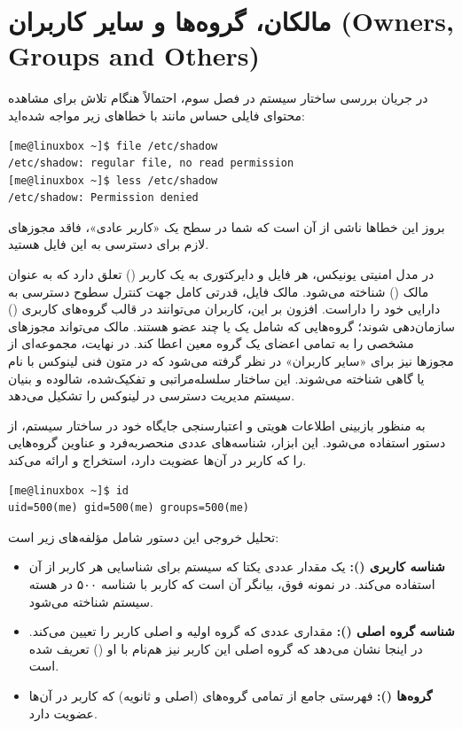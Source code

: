 \section{مالکان، گروه‌ها و سایر کاربران (Owners, Groups and Others)}

در جریان بررسی ساختار سیستم در فصل سوم، احتمالاً هنگام تلاش برای مشاهده محتوای فایلی حساس مانند  با خطاهای زیر مواجه شده‌اید:

\begin{latin}
\begin{lstlisting}
[me@linuxbox ~]$ file /etc/shadow
/etc/shadow: regular file, no read permission
[me@linuxbox ~]$ less /etc/shadow
/etc/shadow: Permission denied
\end{lstlisting}
\end{latin}

بروز این خطاها ناشی از آن است که شما در سطح یک «کاربر عادی»، فاقد مجوزهای لازم برای دسترسی به این فایل هستید.

در مدل امنیتی یونیکس، هر فایل و دایرکتوری به یک کاربر () تعلق دارد که به عنوان مالک () شناخته می‌شود. مالک فایل، قدرتی کامل جهت کنترل سطوح دسترسی به دارایی خود را داراست. افزون بر این، کاربران می‌توانند در قالب گروه‌های کاربری () سازمان‌دهی شوند؛ گروه‌هایی که شامل یک یا چند عضو هستند. مالک می‌تواند مجوزهای مشخصی را به تمامی اعضای یک گروه معین اعطا کند. در نهایت، مجموعه‌ای از مجوزها نیز برای «سایر کاربران» در نظر گرفته می‌شود که در متون فنی لینوکس با نام  یا گاهی  شناخته می‌شوند. این ساختار سلسله‌مراتبی و تفکیک‌شده، شالوده و بنیان سیستم مدیریت دسترسی در لینوکس را تشکیل می‌دهد.

به منظور بازبینی اطلاعات هویتی و اعتبارسنجی جایگاه خود در ساختار سیستم، از دستور  استفاده می‌شود. این ابزار، شناسه‌های عددی منحصربه‌فرد و عناوین گروه‌هایی را که کاربر در آن‌ها عضویت دارد، استخراج و ارائه می‌کند.

\begin{latin}
\begin{lstlisting}
[me@linuxbox ~]$ id
uid=500(me) gid=500(me) groups=500(me)
\end{lstlisting}
\end{latin}

تحلیل خروجی این دستور شامل مؤلفه‌های زیر است:

\begin{itemize}
  \item \textbf{شناسه کاربری ():} یک مقدار عددی یکتا که سیستم برای شناسایی هر کاربر از آن استفاده می‌کند. در نمونه فوق،  بیانگر آن است که کاربر  با شناسه ۵۰۰ در هسته سیستم شناخته می‌شود.
  \item \textbf{شناسه گروه اصلی ():} مقداری عددی که گروه اولیه و اصلی کاربر را تعیین می‌کند. در اینجا  نشان می‌دهد که گروه اصلی این کاربر نیز هم‌نام با او () تعریف شده است.
  \item \textbf{گروه‌ها ():} فهرستی جامع از تمامی گروه‌های (اصلی و ثانویه) که کاربر در آن‌ها عضویت دارد.
\end{itemize}


